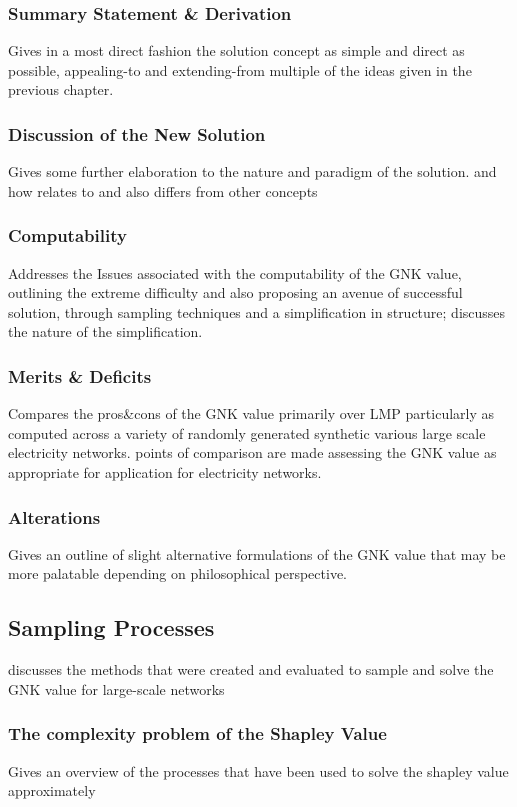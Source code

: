 \documentclass{article}
\begin{document}
\subsubsection{Summary Statement \& Derivation}
Gives in a most direct fashion the solution concept as simple and direct as possible, appealing-to and extending-from multiple of the ideas given in the previous chapter.

\subsubsection{Discussion of the New Solution}
Gives some further elaboration to the nature and paradigm of the solution. and how relates to and also differs from other concepts

\subsubsection{Computability}
Addresses the Issues associated with the computability of the GNK value, outlining the extreme difficulty and also proposing an avenue of successful solution, through sampling techniques and a simplification in structure; discusses the nature of the simplification.

\subsubsection{Merits \& Deficits}
Compares the pros\&cons of the GNK value primarily over LMP particularly as computed across a variety of randomly generated synthetic various large scale electricity networks. points of comparison are made assessing the GNK value as appropriate for application for electricity networks.

\subsubsection{Alterations}
Gives an outline of slight alternative formulations of the GNK value that may be more palatable depending on philosophical perspective.

\subsection{Sampling Processes}
discusses the methods that were created and evaluated to sample and solve the GNK value for large-scale networks

\subsubsection{The complexity problem of the Shapley Value}
Gives an overview of the processes that have been used to solve the shapley value approximately
\end{document}
